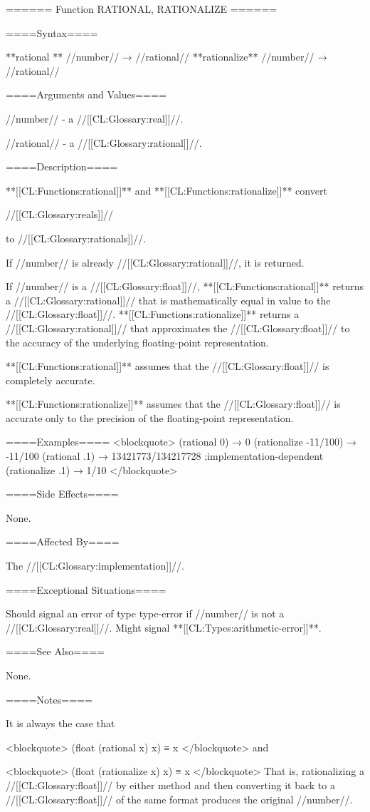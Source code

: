 ====== Function RATIONAL, RATIONALIZE ======

====Syntax====

**rational ** //number// → //rational// **rationalize** //number// → //rational//

====Arguments and Values====

//number// - a //[[CL:Glossary:real]]//.

//rational// - a //[[CL:Glossary:rational]]//.

====Description====

**[[CL:Functions:rational]]** and **[[CL:Functions:rationalize]]** convert

//[[CL:Glossary:reals]]//

to //[[CL:Glossary:rationals]]//.

If //number// is already //[[CL:Glossary:rational]]//, it is returned.

If //number// is a //[[CL:Glossary:float]]//, **[[CL:Functions:rational]]** returns a //[[CL:Glossary:rational]]// that is mathematically equal in value to the //[[CL:Glossary:float]]//. **[[CL:Functions:rationalize]]** returns a //[[CL:Glossary:rational]]// that approximates the //[[CL:Glossary:float]]// to the accuracy of the underlying floating-point representation.

**[[CL:Functions:rational]]** assumes that the //[[CL:Glossary:float]]// is completely accurate.

**[[CL:Functions:rationalize]]** assumes that the //[[CL:Glossary:float]]// is accurate only to the precision of the floating-point representation.

====Examples==== <blockquote> (rational 0) → 0 (rationalize -11/100) → -11/100 (rational .1) → 13421773/134217728 ;implementation-dependent (rationalize .1) → 1/10 </blockquote>

====Side Effects====

None.

====Affected By====

The //[[CL:Glossary:implementation]]//.

====Exceptional Situations====

Should signal an error of type type-error if //number// is not a //[[CL:Glossary:real]]//. Might signal **[[CL:Types:arithmetic-error]]**.

====See Also====

None.

====Notes====

It is always the case that

<blockquote> (float (rational x) x) ≡ x </blockquote> and

<blockquote> (float (rationalize x) x) ≡ x </blockquote> That is, rationalizing a //[[CL:Glossary:float]]// by either method and then converting it back to a //[[CL:Glossary:float]]// of the same format produces the original //number//.

